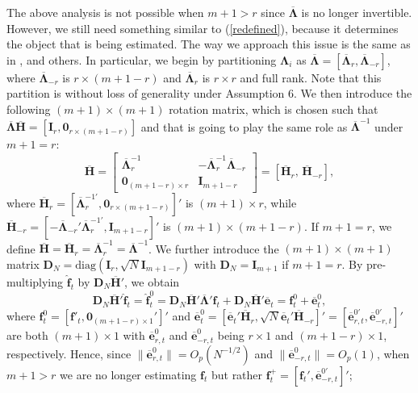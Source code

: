 \documentclass[12pt,fleqn]{article}
\def\*#1{\mathbf{#1}}
\def\+#1{\boldsymbol{#1}}
\begin{document}
The above analysis is not possible when $m +1> r$ since $\overline{\+{\Lambda}}$ is no longer invertible. However, we still need something similar to (\ref{redefined}), because it determines the object that is being estimated. The way we approach this issue is the same as in \citet{westerlund2019cce}, and others. In particular, we begin by partitioning $\+{\Lambda}_i$ as $\overline{\+{\Lambda}}=[\overline{\+{\Lambda}}_r, \overline{\+{\Lambda}}_{-r}]$, where $\overline{\+{\Lambda}}_{-r}$ is $r\times (m+1-r)$ and $\overline{\+{\Lambda}}_r$ is $r \times r$ and full rank. Note that this partition is without loss of generality under Assumption 6. We then introduce the following $(m+1)\times (m+1)$ rotation matrix, which is chosen such that $\overline{\+{\Lambda}}\overline{\*{H}}= [\*{I}_r, \*{0}_{r\times (m+1-r)}]$ and that is going to play the same role as $\overline{\+{\Lambda}}^{-1}$ under $m+1=r$:
\begin{equation}
    \overline{\*{H}} =\left[\begin{array}{cc}\overline{\+{\Lambda}}_r^{-1} & -\overline{\+{\Lambda}}_r^{-1}\overline{\+{\Lambda}}_{-r}\\
    \*{0}_{(m+1-r)\times r} & \*{I}_{m+1-r}\end{array}\right]=[\overline{\*{H}}_r,\, \overline{\*{H}}_{-r}],
\end{equation}
where $\overline{\*{H}}_r=[\overline{\+{\Lambda}}_r^{-1\prime}, \*{0}_{r\times (m+1-r)} ]'$ is $(m+1)\times r$, while $\overline{\*{H}}_{-r}=[ -\overline{\+{\Lambda}}_{-r}'\overline{\+{\Lambda}}_r^{-1\prime}, \*{I}_{m+1-r}]'$ is $(m+1)\times (m+1-r)$. If $m+1=r$, we define $\overline{\*{H}}=\overline{\*{H}}_r=\overline{\+{\Lambda}}_r^{-1}=\overline{\+{\Lambda}}^{-1}$. We further introduce the $(m+1)\times (m+1)$ matrix $\*{D}_N= \mathrm{diag}(\*{I}_r , \sqrt{N}\*{I}_{m+1-r})$ with $\*{D}_N=\*{I}_{m+1}$ if $m+1=r$. By pre-multiplying $\widehat{\*{f}}_t$ by $\*{D}_N\overline{\*{H}}'$, we obtain
\begin{equation}\label{fhat0}
    \*{D}_N\overline{\*{H}}'\widehat{\*{f}}_t=\widehat{\*{f}}^0_t= \*{D}_N\overline{\*{H}}'\overline{\+{\Lambda}}'\*{f}_t+ \*{D}_N\overline{\*{H}}'\overline{\*e}_t=\*{f}^0_t+\overline{\*e}^0_t,
\end{equation}
where $\*{f}^0_t=[\*{f}'_t, \*{0}_{(m+1-r)\times 1}']'$ and $\overline{\*e}^0_t=[\overline{\*e}_{t}'\overline{\*H}_r, \sqrt{N}\overline{\*{e}}_{t}'\overline{\*H}_{-r}]'=
[\overline{\*{e}}^{0\prime}_{r,t}, \overline{\*{e}}^{0\prime}_{-r,t}]'$ are both $(m+1)\times 1$ with $\overline{\*{e}}_{r,t}^0$ and $\overline{\*{e}}_{-r,t}^0$ being $r\times 1$ and $(m+1-r)\times 1$, respectively. Hence, since $\|\overline{\*{e}}_{r,t}^0\| =O_p(N^{-1/2})$ and $\|\overline{\*{e}}_{-r,t}^0\| =O_p(1)$, when $m + 1> r$ we are no longer estimating $\*{f}_t$ but rather $\*f_t^+ = [\*{f}_t', \overline{\*{e}}_{-r,t}^{0\prime}]'$;
\end{document}
